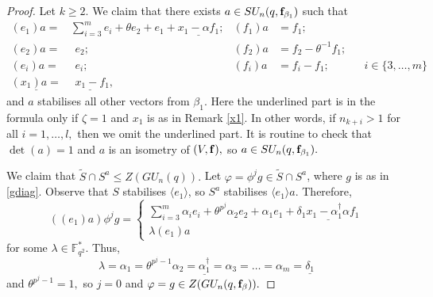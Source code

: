 \begin{proof}
Let $k\ge 2$. We claim that there exists  $a \in SU_n(q, {\bf f}_{\beta_1})$ such that 
\begin{equation}
\begin{aligned}
(e_1)a =   & \sum_{i=3}^m e_i +\theta e_2+ e_1 + \underline{x_1 -\alpha f_1}; &  (f_1)a & =f_1;  \\
(e_{2})a = & \phantom{(} e_{2}; &  (f_{2})a & =f_{2}- \theta^{-1}f_1; &&   \\
(e_{i})a = & \phantom{(} e_{i};&  (f_{i})a & =f_{i} -  f_{1}; && i \in \{3, \ldots, m \}   \\
\underline{(x_1)a =}&\underline{  \phantom{(}x_1-f_1}, 
\end{aligned}
\end{equation}
and $a$ stabilises all other vectors from $\beta_1.$ Here the underlined part is  in the formula only if ${\zeta}=1$ and $x_1$ is as in Remark \ref{x1}. In other words, if $n_{k+i}>1$  for all $i=1, \ldots, l,$ then we  omit the underlined part.
It is routine to check that $\det(a)=1$ and $a$ is an isometry of $(V, {\bf f}),$ so $a \in SU_n(q,{\bf f}_{\beta_1}).$

We claim that $\tilde{S} \cap S^a \le Z(GU_n(q)).$ Let $\varphi= \phi^jg \in \tilde{S} \cap S^a$, where $g$ is as in \eqref{gdiag}. Observe that $S$ stabilises  $\langle e_1\rangle$, so $S^a$ stabilises $\langle e_1\rangle a.$ Therefore, 
\begin{equation}
((e_1)a)\phi^j g=
\begin{cases}
\sum_{i=3}^m\alpha_i e_i +\theta^{p^j}\alpha_2 e_2 + \alpha_1e_1 + \underline{\delta_1 x_1 -\alpha_1^{\dagger} \alpha f_1}\\
\lambda (e_1)a
\end{cases}
\end{equation}
for some $\lambda \in \mathbb{F}_{q^2}^*.$  Thus, $$\lambda=\alpha_1=\theta^{p^j-1}\alpha_2 =\underline{\alpha_1^{\dagger}} =\alpha_{3}=\ldots=\alpha_m=\underline{\delta_1}$$
and $\theta^{p^j-1}=1,$ so $j=0$ and $\varphi =g \in Z(GU_n(q, {\bf f}_{\beta})).$

\medskip


\end{proof}
